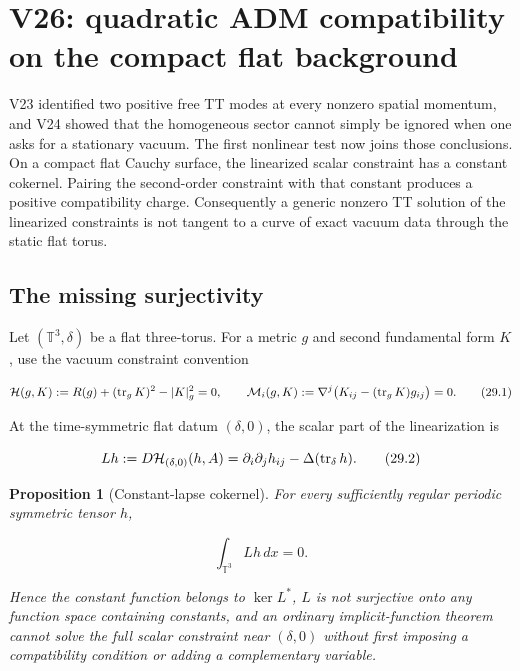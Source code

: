 \documentclass[11pt]{article}
\newtheorem{proposition}[theorem]{Proposition}
\theoremstyle{remark}
\begin{document}
\section{V26: quadratic ADM compatibility on the compact flat background}
\label{sec:v19v26}

V23 identified two positive free TT modes at every nonzero spatial
momentum, and V24 showed that the homogeneous sector cannot simply be
ignored when one asks for a stationary vacuum.  The first nonlinear test
now joins those conclusions.  On a compact flat Cauchy surface, the
linearized scalar constraint has a constant cokernel.  Pairing the
second-order constraint with that constant produces a positive
compatibility charge.  Consequently a generic nonzero TT solution of the
linearized constraints is not tangent to a curve of exact vacuum data
through the static flat torus.

\subsection{The missing surjectivity}

Let \((\mathbb T^3,\delta)\) be a flat three-torus.  For a metric \(g\)
and second fundamental form \(K\), use the vacuum constraint convention

\[
 {\cal H}(g,K):=R(g)+(\operatorname{tr}_gK)^2-|K|_g^2=0,
 \qquad
 {\cal M}_i(g,K):=\nabla^j
 \bigl(K_{ij}-(\operatorname{tr}_gK)g_{ij}\bigr)=0.            \tag{29.1}
\]

At the time-symmetric flat datum \((\delta,0)\), the scalar part of the
linearization is

\[
 Lh:=D{\cal H}_{(\delta,0)}(h,A)
 =\partial_i\partial_jh_{ij}
  -\Delta(\operatorname{tr}_\delta h).                         \tag{29.2}
\]

\begin{proposition}[Constant-lapse cokernel]
\label{prop:v19v26-cokernel}
For every sufficiently regular periodic symmetric tensor \(h\),

\[
 \int_{\mathbb T^3}Lh\,dx=0.                                  \tag{29.3}
\]

Hence the constant function belongs to \(\ker L^*\), \(L\) is not
surjective onto any function space containing constants, and an ordinary
implicit-function theorem cannot solve the full scalar constraint near
\((\delta,0)\) without first imposing a compatibility condition or adding
a complementary variable.
\end{proposition}
\end{document}
